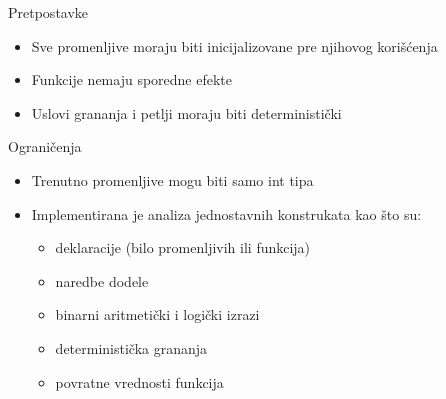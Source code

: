 \begin{frame}{Pretpostavke}
    \begin{itemize}
        \item Sve promenljive moraju biti inicijalizovane pre njihovog kori\v{s}\'c{}enja
        \item Funkcije nemaju sporedne efekte
        \item Uslovi grananja i petlji moraju biti deterministi\v{c}ki
    \end{itemize}
\end{frame}

\begin{frame}{Ograni\v{c}enja}
    \begin{itemize}
        \item Trenutno promenljive mogu biti samo int tipa
        \item Implementirana je analiza jednostavnih konstrukata kao \v{s}to su:
        \begin{itemize}
            \item deklaracije (bilo promenljivih ili funkcija)
            \item naredbe dodele
            \item binarni aritmeti\v{c}ki i logi\v{c}ki izrazi
            \item deterministi\v{c}ka grananja
            \item povratne vrednosti funkcija
        \end{itemize}
    \end{itemize}
\end{frame}
